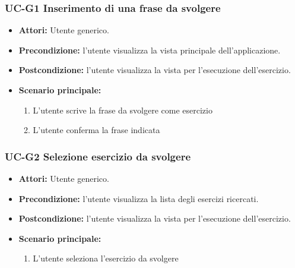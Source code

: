 	\subsubsection{UC-G1 Inserimento di una frase da svolgere}
	\begin{itemize}
		\item \textbf{Attori:} Utente generico.
		\item \textbf{Precondizione:} l'utente visualizza la vista principale dell'applicazione.
		\item \textbf{Postcondizione:} l'utente visualizza la vista per l'esecuzione dell'esercizio.
		\item \textbf{Scenario principale:}
		\begin{enumerate}
			\item L'utente scrive la frase da svolgere come esercizio
			\item L'utente conferma la frase indicata
		\end{enumerate}
	\end{itemize}

	\subsubsection{UC-G2 Selezione esercizio da svolgere}
	\begin{itemize}
			\item \textbf{Attori:} Utente generico.
			\item \textbf{Precondizione:} l'utente visualizza la lista degli esercizi ricercati.
			\item \textbf{Postcondizione:} l'utente visualizza la vista per l'esecuzione dell'esercizio.
			\item \textbf{Scenario principale:}
			\begin{enumerate}
					\item L'utente seleziona l'esercizio da svolgere
			\end{enumerate}
	\end{itemize}

